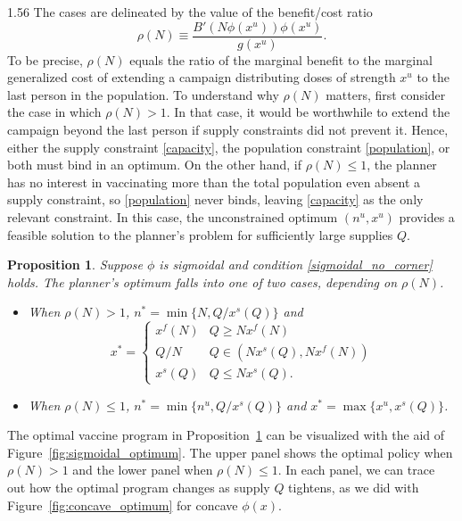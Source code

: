 \documentclass[12pt]{article}
\newcommand{\efficacy}{\phi}
\newcommand{\general}{g}
\newcommand{\benefit}{B}
\newcommand{\ratio}{\rho(N)}
\newcommand{\xfull}{x^{f\!}}
\newcommand{\xshort}{x^{s}}
\newcommand{\xun}{x^{u}}
\newcommand{\nun}{n^{u}}
\newtheorem{proposition}{Proposition}
\begin{document}
\begin{spacing}{1.56}
The cases are delineated by the value of the benefit/cost ratio
\begin{equation}
\label{bcr}
\ratio \equiv \frac{\benefit'(N\efficacy(\xun))
  \efficacy(\xun)}{\general(\xun)}.
\end{equation}
To be precise, $\ratio$ equals the ratio of the marginal benefit to the
marginal generalized cost of extending a campaign distributing doses
of strength $\xun$ to the last person in the population. To understand why $\ratio$ matters, first consider the case in which $\ratio > 1$. In that case,
it would be worthwhile to extend the campaign beyond the last person
if supply constraints did not prevent it. Hence, either the supply
constraint \eqref{capacity}, the population constraint
\eqref{population}, or both must bind in an optimum.  
On the other hand, if $\ratio \leq 1$, the planner has no interest in vaccinating more
than the total population even absent a supply constraint, so
\eqref{population} never binds, leaving \eqref{capacity} as the only
relevant constraint. In this case, the
unconstrained optimum $(\nun, \xun)$ provides a feasible solution to the
planner's problem for sufficiently large supplies $Q$.
\begin{proposition}
\label{p:sigmoidal_optimum}
\singlespace
Suppose $\efficacy$ is sigmoidal and condition
\eqref{sigmoidal_no_corner} holds.  The planner's optimum falls into
one of two cases, depending on $\ratio$.
\begin{itemize}

\item When $\ratio > 1$,  $n^* = \min \{ N, Q / \xshort(Q) \}$ and
\[
x^* = \begin{cases}
\xfull(N) & Q \geq N \xfull(N) \\
Q/N & Q \in \left( N \xshort(Q), N \xfull(N) \right) \\ 
\xshort(Q) & Q \leq N\xshort(Q).
\end{cases}
\]

\item When $\ratio \leq 1$, $n^* = \min \{ \nun, Q / \xshort(Q) \}$ and $x^* = \max \{ \xun, \xshort(Q) \}$.
\end{itemize}
\end{proposition}

The optimal vaccine program in Proposition~\ref{p:sigmoidal_optimum}
can be visualized with the aid of
Figure~\ref{fig:sigmoidal_optimum}. The upper panel shows the optimal
policy when $\ratio > 1$ and the lower panel when $\ratio \leq 1$. In each
panel, we can trace out how the optimal program changes as supply
$Q$ tightens, as we did with
Figure~\ref{fig:concave_optimum} for concave $\efficacy(x)$.


\end{spacing}
\end{document}
